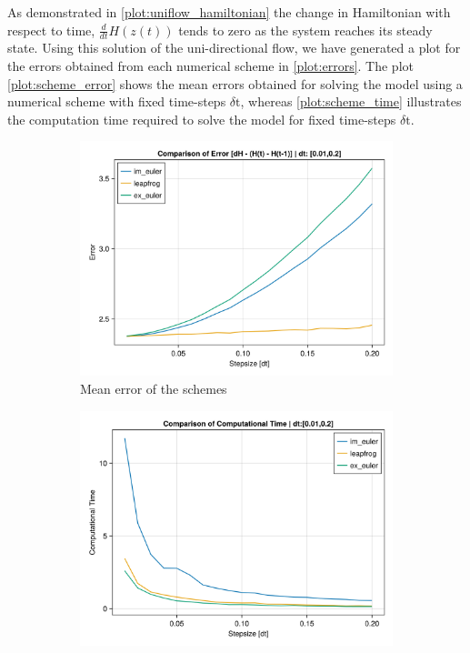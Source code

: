 As demonstrated in \autoref{plot:uniflow_hamiltonian} the change in Hamiltonian with respect to time, $\frac{d}{dt}H(z(t))$ tends to zero as the system reaches its steady state. Using this solution of the uni-directional flow, we have generated a plot for the errors obtained from each numerical scheme in \autoref{plot:errors}. The plot \autoref{plot:scheme_error} shows the mean errors obtained for solving the model using a numerical scheme with fixed time-steps $\delta \text{t}$, whereas \autoref{plot:scheme_time} illustrates the computation time required to solve the model for fixed time-steps $\delta \text{t}$.

\begin{figure}[H]
    \centering
    \begin{subfigure}{.49\textwidth}
        \centering
        \includegraphics[width=\linewidth]{figures/manual_scheme_error1.png}
        \caption{Mean error of the schemes}
        \label{plot:scheme_error}
    \end{subfigure}
    \begin{subfigure}{.49\textwidth}
        \centering
        \includegraphics[width=\linewidth]{figures/time1.png}

\end{subfigure}
\end{figure}
